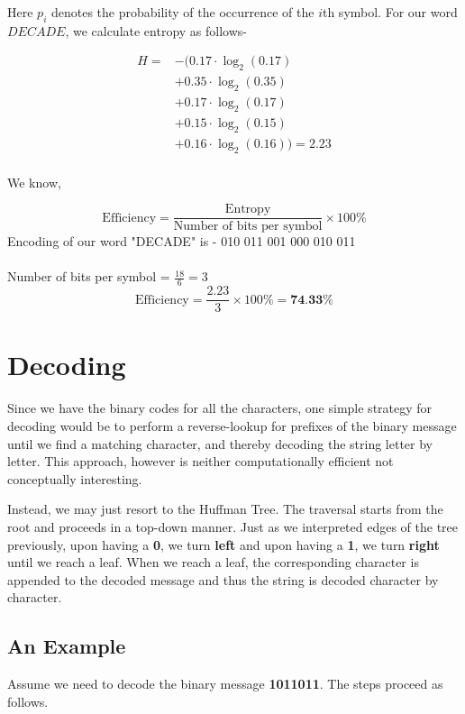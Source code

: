 \documentclass[18pt]{article}
\begin{document}
	Here $p_i$ denotes the probability of the occurrence of the $i$th symbol. For our word $DECADE$, we calculate entropy as follows-
	
	\begin{align*}
		H = & - (0.17 \cdot \log_2(0.17) \\
		& + 0.35 \cdot \log_2(0.35) \\
		& + 0.17 \cdot \log_2(0.17) \\
		& + 0.15 \cdot \log_2(0.15) \\
		& + 0.16 \cdot \log_2(0.16)) = 2.23 \\
	\end{align*}
	
	We know, 
	
	\[
	\text{Efficiency} = \frac{\text{Entropy}}{\text{Number of bits per symbol}} \times 100 \%
	\]
	$$$$
	Encoding of our word "DECADE" is - 010 011 001 000 010 011
	\\\\
	Number of bits per symbol = $\frac{18}{6} = 3$
	$$$$
	\[
	\text{Efficiency} = \frac{2.23}{3}\times 100\% = \textbf{74.33\%}
	\]
	
	
	\newpage
	
	\section{Decoding}
	
	Since we have the binary codes for all the characters, one simple strategy for decoding would be to perform a reverse-lookup for prefixes of the binary message until we find a matching character, and thereby decoding the string letter by letter. This approach, however is neither computationally efficient not conceptually interesting.
	
	Instead, we may just resort to the Huffman Tree. The traversal starts from the root and proceeds in a top-down manner. Just as we interpreted edges of the tree previously, upon having a \textbf{0}, we turn \textbf{left} and upon having a \textbf{1}, we turn \textbf{right} until we reach a leaf. When we reach a leaf, the corresponding character is appended to the decoded message and thus the string is decoded character by character.
	
	
	\subsection{An Example}
	
	Assume we need to decode the binary message \textbf{1011011}. The steps proceed as follows.
	
\end{document}
